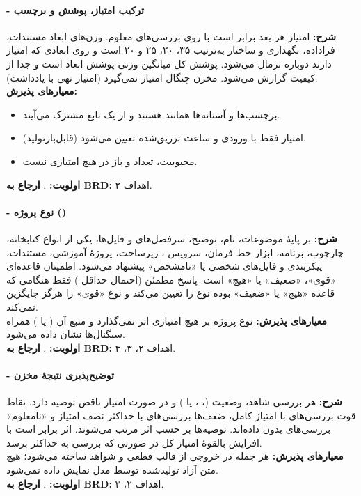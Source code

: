 \documentclass[12pt]{article}
\begin{document}
 \paragraph{ - ترکیب امتیاز، پوشش و برچسب}
\textbf{شرح:} امتیاز هر بعد برابر است با  روی بررسی‌های معلوم. وزن‌های ابعاد مستندات، فراداده، نگهداری و ساختار به‌ترتیب ۳۵، ۲۰، ۲۵ و ۲۰ است و روی ابعادی که امتیاز دارند دوباره نرمال می‌شود. پوشش کل میانگین وزنی پوشش ابعاد است و جدا از کیفیت گزارش می‌شود. مخزن چنگال امتیاز نمی‌گیرد (امتیاز تهی با یادداشت).
\\
\textbf{معیارهای پذیرش:}
\begin{itemize}
\item برچسب‌ها و آستانه‌ها همانند \textbf{} هستند و از یک تابع مشترک می‌آیند.
\item امتیاز فقط با ورودی و ساعت تزریق‌شده تعیین می‌شود (قابل‌بازتولید).
\item محبوبیت، تعداد  و  باز در هیچ امتیازی نیست.
\end{itemize}
\textbf{اولویت:} . \textbf{ارجاع به BRD:} اهداف ۲.
 \paragraph{ - نوع پروژه ()}
\textbf{شرح:} بر پایهٔ موضوعات، نام، توضیح، سرفصل‌های  و فایل‌ها، یکی از انواع کتابخانه، چارچوب، برنامه، ابزار خط فرمان، سرویس ، زیرساخت، پروژهٔ آموزشی، مستندات، پیکربندی و فایل‌های شخصی یا «نامشخص» پیشنهاد می‌شود. اطمینان قاعده‌ای «قوی»، «ضعیف» یا «هیچ» است. پاسخ مطمئن  (احتمال حداقل ) فقط هنگامی که قاعده «هیچ» یا «ضعیف» بوده نوع را تعیین می‌کند و نوع «قوی» را هرگز جایگزین نمی‌کند.
\\
\textbf{معیارهای پذیرش:} نوع پروژه بر هیچ امتیازی اثر نمی‌گذارد و منبع آن ( یا ) همراه سیگنال‌ها نشان داده می‌شود.
\\
\textbf{اولویت:} . \textbf{ارجاع به BRD:} اهداف ۲، ۳، ۴.
 \paragraph{ - توضیح‌پذیری نتیجهٔ مخزن}
\textbf{شرح:} هر بررسی شاهد، وضعیت (، ،  یا ) و در صورت امتیاز ناقص توصیه دارد. نقاط قوت بررسی‌های با امتیاز کامل، ضعف‌ها بررسی‌های با حداکثر نصف امتیاز و «نامعلوم» بررسی‌های بدون داده‌اند. توصیه‌ها بر حسب اثر مرتب می‌شوند. اثر برابر است با افزایش بالقوهٔ امتیاز کل در صورتی که بررسی به حداکثر برسد.
\\
\textbf{معیارهای پذیرش:} هر جمله در خروجی از قالب قطعی و شواهد ساخته می‌شود؛ هیچ متن آزاد تولیدشده توسط مدل نمایش داده نمی‌شود.
\\
\textbf{اولویت:} . \textbf{ارجاع به BRD:} اهداف ۲، ۳.
\end{document}
